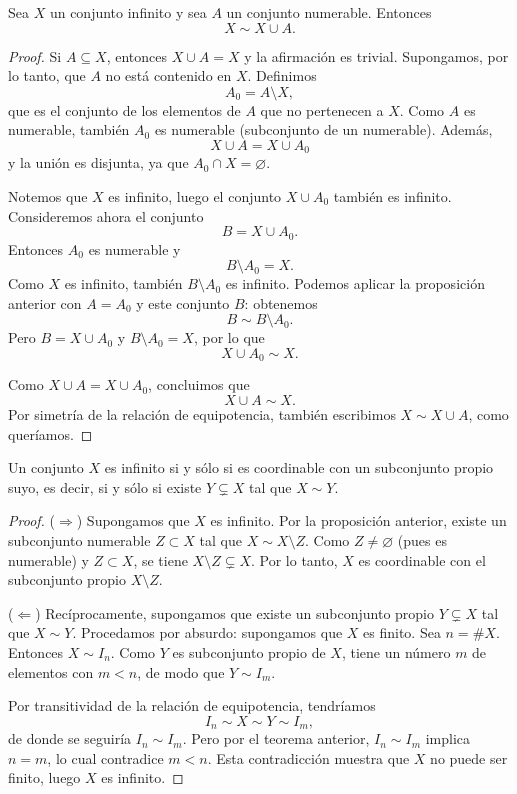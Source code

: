 \begin{prop}
Sea $X$ un conjunto infinito y sea $A$ un conjunto numerable.
Entonces
\[
X \sim X \cup A.
\]
\end{prop}

\begin{proof}
Si $A \subseteq X$, entonces $X \cup A = X$ y la afirmación es trivial.
Supongamos, por lo tanto, que $A$ no está contenido en $X$. Definimos
\[
A_0 = A \setminus X,
\]
que es el conjunto de los elementos de $A$ que no pertenecen a $X$.
Como $A$ es numerable, también $A_0$ es numerable (subconjunto de un
numerable). Además,
\[
X \cup A = X \cup A_0
\]
y la unión es disjunta, ya que $A_0 \cap X = \varnothing$.

Notemos que $X$ es infinito, luego el conjunto $X \cup A_0$ también es
infinito. Consideremos ahora el conjunto
\[
B = X \cup A_0.
\]
Entonces $A_0$ es numerable y
\[
B \setminus A_0 = X.
\]
Como $X$ es infinito, también $B \setminus A_0$ es infinito. Podemos
aplicar la proposición anterior con $A = A_0$ y este conjunto $B$:
obtenemos
\[
B \sim B \setminus A_0.
\]
Pero $B = X \cup A_0$ y $B \setminus A_0 = X$, por lo que
\[
X \cup A_0 \sim X.
\]

Como $X \cup A = X \cup A_0$, concluimos que
\[
X \cup A \sim X.
\]
Por simetría de la relación de equipotencia, también escribimos
$X \sim X \cup A$, como queríamos.
\end{proof}

\begin{cor}
Un conjunto $X$ es infinito si y sólo si es coordinable con un subconjunto
propio suyo, es decir, si y sólo si existe $Y \subsetneq X$ tal que
$X \sim Y$.
\end{cor}

\begin{proof}
($\Rightarrow$) Supongamos que $X$ es infinito.
Por la proposición anterior, existe un subconjunto numerable
$Z \subset X$ tal que $X \sim X \setminus Z$.
Como $Z \ne \varnothing$ (pues es numerable) y $Z \subset X$, se tiene
$X \setminus Z \subsetneq X$.
Por lo tanto, $X$ es coordinable con el subconjunto propio
$X \setminus Z$.

($\Leftarrow$) Recíprocamente, supongamos que existe un subconjunto propio
$Y \subsetneq X$ tal que $X \sim Y$.
Procedamos por absurdo: supongamos que $X$ es finito.
Sea $n = \#X$. Entonces $X \sim I_n$.
Como $Y$ es subconjunto propio de $X$, tiene un número $m$ de elementos
con $m < n$, de modo que $Y \sim I_m$.

Por transitividad de la relación de equipotencia, tendríamos
\[
I_n \sim X \sim Y \sim I_m,
\]
de donde se seguiría $I_n \sim I_m$.
Pero por el teorema anterior, $I_n \sim I_m$ implica $n = m$,
lo cual contradice $m < n$.
Esta contradicción muestra que $X$ no puede ser finito, luego
$X$ es infinito.
\end{proof}

